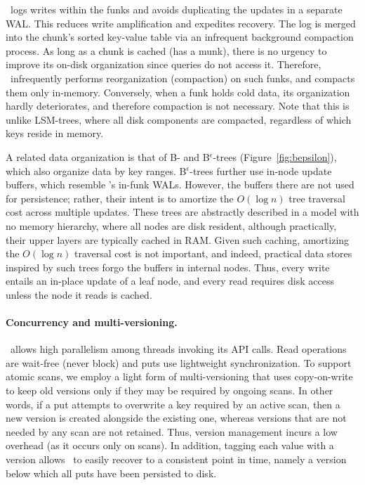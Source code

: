 \sys\ logs writes within the funks and avoids duplicating the updates  in a separate WAL. This reduces write amplification and expedites recovery. 
The  log is merged into the chunk's sorted key-value table via an infrequent background compaction process. 
As long as a chunk is cached (has a munk), there is no urgency to improve its on-disk organization since 
queries do not access it. Therefore, \sys\ infrequently performs reorganization (compaction) on such funks,
and compacts them only in-memory.
Conversely, when a funk holds cold data, its organization hardly deteriorates, and therefore compaction is not necessary.
Note that this is unlike LSM-trees, where all disk components are compacted, regardless of which keys reside in memory.

A related data organization is that of  B- and B$^\epsilon$-trees (Figure~\ref{fig:bepsilon}), which also organize data by key ranges. 
B$^\epsilon$-trees further use in-node update buffers, which resemble \sys's in-funk WALs.
However, the buffers there are not used for persistence; rather, their intent is to amortize the $O(\log n)$ tree traversal cost across multiple updates. 
These trees are abstractly described in  a model with no memory hierarchy, where all nodes are disk resident, although practically, their upper layers 
are typically cached in RAM. Given such caching, amortizing the $O(\log n)$ traversal cost is not important, and indeed, practical data stores inspired by
such trees forgo the buffers in internal nodes. Thus, every write entails an in-place update of a leaf node, and every read requires disk access unless the node it reads is cached.

 \paragraph{Concurrency and multi-versioning.}
 \sys\ allows high parallelism among threads invoking its API calls. 
 Read operations are wait-free (never block) and puts use lightweight synchronization. 
 To support atomic scans, we  employ a light form of multi-versioning that uses 
copy-on-write to keep old versions only if they may be required by ongoing scans. 
In other words, if a put attempts to overwrite a key required by an active scan, then a new version is created alongside the 
existing one, whereas versions that are not needed by any scan are not retained. 
Thus, version management incurs a low overhead (as it occurs only on scans). 
In addition, tagging each value with a version allows \sys\ to easily recover to a consistent point in time, namely a version below which all puts have been persisted to disk.

